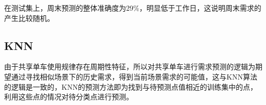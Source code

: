 \documentclass[]{tongjithesis}
\numberwithin{equation}{chapter}
\begin{document}
在测试集上，周末预测的整体准确度为29\%，明显低于工作日，这说明周末需求的产生比较随机。

\subsection{KNN}
由于共享单车使用规律存在周期性特征，所以对共享单车进行需求预测的逻辑为期望通过寻找相似场景下的历史需求，得到当前场景需求的可能值，这与KNN算法的逻辑是一致的，KNN的预测方法即为找到与待预测点值相近的训练集中的点，利用这些点的情况对待分类点进行预测。
\end{document}
